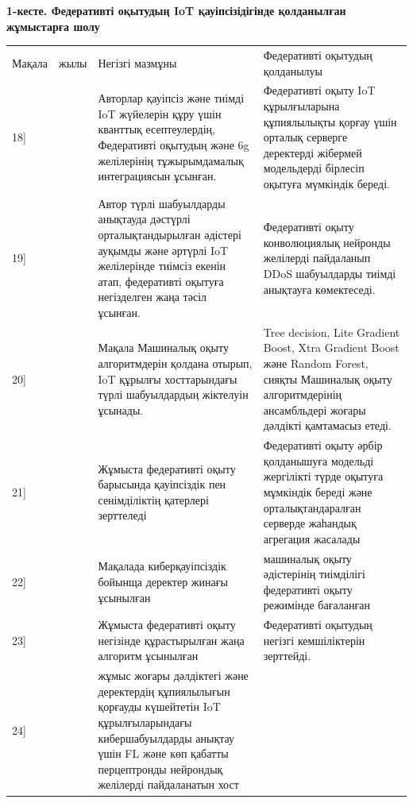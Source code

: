 {\bfseries 1-кесте. Федеративті оқытудың IoT қауіпсізідігінде қолданылған
жұмыстарға шолу}

\begin{longtable}[]{@{}
  >{\raggedright\arraybackslash}p{}
  >{\raggedright\arraybackslash}p{}
  >{\raggedright\arraybackslash}p{}
  >{\raggedright\arraybackslash}p{}@{}}
\toprule\noalign{}
\endhead
\bottomrule\noalign{}
\endlastfoot
Мақала & жылы & Негізгі мазмұны & Федеративті оқытудың қолданылуы \\
{[}18{]} & 2024 & Авторлар қауіпсіз және тиімді IoT жүйелерін құру үшін
кванттық есептеулердің, Федеративті оқытудың және 6g желілерінің
тұжырымдамалық интеграциясын ұсынған. & Федеративті оқыту IoT
құрылғыларына құпиялылықты қорғау үшін орталық серверге деректерді
жібермей модельдерді бірлесіп оқытуға мүмкіндік береді. \\
{[}19{]} & 2024 & Автор түрлі шабуылдарды анықтауда дәстүрлі
орталықтандырылған әдістері ауқымды және әртүрлі IoT желілерінде тиімсіз
екенін атап, федеративті оқытуға негізделген жаңа тәсіл ұсынған. &
Федеративті оқыту конволюциялық нейронды желілерді пайдаланып DDoS
шабуылдарды тиімді анықтауға көмектеседі. \\
{[}20{]} & 2024 & Мақала Машиналық оқыту алгоритмдерін қолдана отырып,
IoT құрылғы хосттарындағы түрлі шабуылдардың жіктелуін ұсынады. & Tree
decision, Lite Gradient Boost, Xtra Gradient Boost және Random Forest,
сияқты Машиналық оқыту алгоритмдерінің ансамбльдері жоғары дәлдікті
қамтамасыз етеді. \\
{[}21{]} & 2020 & Жұмыста федеративті оқыту барысында қауіпсіздік пен
сенімділіктің қатерлері зерттеледі & Федеративті оқыту әрбір қолданышуға
модельді жергілікті түрде оқытуға мұмкіндік береді және
орталықтандаралған серверде жаһандық агрегация жасалады \\
{[}22{]} & 2022 & Мақалада киберқауіпсіздік бойынща деректер жинағы
ұсынылған & машиналық оқыту әдістерінің тиімділігі федеративті оқыту
режимінде бағаланған \\
{[}23{]} & 2022 & Жұмыста федеративті оқыту негізінде құрастырылған жаңа
алгоритм ұсынылған & Федеративті оқытудың негізгі кемшіліктерін
зерттейді. \\
{[}24{]} & 2023 & жұмыс жоғары дәлдіктегі және деректердің құпиялылығын
қорғауды күшейтетін IoT құрылғыларындағы кибершабуылдарды анықтау үшін
FL және көп қабатты перцептронды нейрондық желілерді пайдаланатын хост

\end{longtable}
